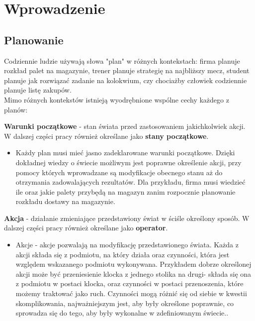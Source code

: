 \chapter{Wprowadzenie}
\thispagestyle{chapterBeginStyle}
\label{rozdzial1}
\section{Planowanie}

    Codziennie ludzie używają słowa "plan" w różnych kontekstach: firma planuje rozkład palet na magazynie, trener planuje strategię na
    najbliższy mecz, student planuje jak rozwiązać zadanie na kolokwium, czy chociażby człowiek codziennie planuje listę zakupów. \\
    Mimo różnych kontekstów istnieją wyodrębnione wspólne cechy każdego z planów:
    \begin{definition}
    \label{StanyPoczatkowe}
        \textbf{Warunki początkowe} - stan świata przed zastosowaniem jakichkolwiek akcji. W dalszej części pracy również określane jako 
        \textbf{stany początkowe}.
    \end{definition}
    \begin{itemize}
        \item Każdy plan musi mieć jasno zadeklarowane warunki początkowe.
        Dzięki dokładnej wiedzy o świecie możliwym jest poprawne określenie akcji, przy pomocy których wprowadzane są modyfikacje
        obecnego stanu aż do otrzymania zadowalających rezultatów. Dla przykładu, firma musi wiedzieć ile oraz jakie palety 
        przybędą na magazyn zanim rozpocznie planowanie rozkładu dostawy na magazynie.
    \end{itemize}
    \begin{definition}
    \label{Akcje}
        \textbf{Akcja} - działanie zmieniające przedstawiony świat w ściśle określony sposób. W dalszej części pracy również określane jako
        \textbf{operator}.
    \end{definition}
    \begin{itemize}
        \item Akcje - akcje pozwalają na modyfikację przedstawionego świata. Każda z akcji składa się z podmiotu, na który działa oraz czynności,
        która jest względem wskazanego podmiotu wykonywana. Przykładem dobrze określonej akcji może być przeniesienie klocka z 
        jednego stolika na drugi- składa się ona z podmiotu w postaci klocka, oraz czynności w postaci przenoszenia, które możemy traktować
        jako ruch. Czynności mogą różnić się od siebie w kwestii skomplikowania, najważniejszym jest, aby były określone poprawnie, co
        sprowadza się do tego, aby były wykonalne w zdefiniowanym świecie..
    \end{itemize}
